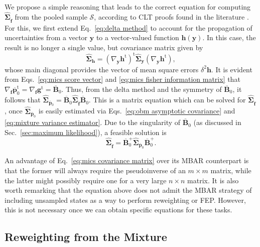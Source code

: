 \documentclass[journal=jctcce,manuscript=article,layout=twocolumn]{achemso}
\newcommand{\mt}[1]{\boldsymbol{\mathbf{#1}}}   %
\newcommand{\vt}[1]{\boldsymbol{\mathbf{#1}}}   %
\newcommand{\tr}[1]{#1^\text{t}}                %
\newcommand{\avg}[1]{\overline{#1}}             %
\begin{document}
We propose a simple reasoning that leads to the correct equation for computing $ \hat{\mt \Sigma}_{\hat{\vt f}}$ from the pooled sample $\mathcal S$, according to CLT proofs found in the literature \cite{Geyer_1994, Buta_2010, Buta_2011, Doss_2014}. For this, we first extend Eq.~\eqref{eq:delta method} to account for the propagation of uncertainties from a vector $\vt y$ to a vector-valued function $\vt h({\vt y})$. In this case, the result is no longer a single value, but covariance matrix given by
\begin{equation*}
\label{eq:vectorial delta method}
\hat{\mt \Sigma}_{\vt h} = \tr{(\nabla_{\vt y} \tr{\vt h})} \hat{\mt \Sigma}_{\vt y}(\nabla_{\vt y} \tr{\vt h}),
\end{equation*}
whose main diagonal provides the vector of mean square errors $\delta^2 \vt h$. It is evident from Eqs.~\eqref{eq:mics score vector} and \eqref{eq:mics fisher information matrix} that $\nabla_{\vt f}\tr{\avg{\vt p}}_0 = \nabla_{\vt f}\tr{\vt g} = \avg{\mt B}_0$. Thus, from the delta method and the symmetry of $\avg{\mt B}_0$, it follows that $\hat{\mt \Sigma}_{\avg{\vt p}_0} = \avg{\mt B}_0 \hat{\mt \Sigma}_{\hat{\vt f}} \avg{\mt B}_0$. This is a matrix equation which can be solved for $\hat{\mt \Sigma}_{\hat{\vt f}}$, once $\hat{\mt \Sigma}_{\avg{\vt p}_0}$ is easily estimated via Eqs.~\eqref{eq:obm asymptotic covariance} and \eqref{eq:mixture variance estimator}. Due to the singularity of $\avg{\mt B}_0$ (as discussed in Sec.~\ref{sec:maximum likelihood}), a feasible solution is
\begin{equation}
\label{eq:mics covariance matrix}
\hat{\mt \Sigma}_{\hat{\vt f}} = \avg{\mt B}_0^+  \hat{\mt \Sigma}_{\avg{\vt p}_0} \avg{\mt B}_0^+.
\end{equation}

An advantage of Eq.~\eqref{eq:mics covariance matrix} over its MBAR counterpart is that the former will always require the pseudoinverse of an $m \times m$ matrix, while the latter might possibly require one for a very large $n \times n$ matrix. It is also worth remarking that the equation above does not admit the MBAR strategy of including unsampled states as a way to perform reweighting or FEP. However, this is not necessary once we can obtain specific equations for these tasks.

\subsection{Reweighting from the Mixture}
\label{sec:mics reweighting}
\end{document}
